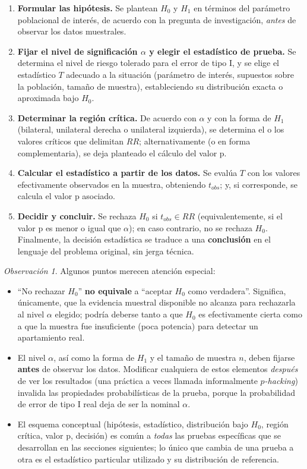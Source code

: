 \documentclass[11pt,a4paper]{article}
\theoremstyle{plain}
\theoremstyle{definition}
\theoremstyle{remark}
\newtheorem{observacion}[teorema]{Observación}
\begin{document}
\begin{enumerate}[label=\textbf{Paso \arabic*.}, wide]
\item \textbf{Formular las hipótesis.} Se plantean $H_0$ y $H_1$ en términos del parámetro poblacional de interés, de acuerdo con la pregunta de investigación, \emph{antes} de observar los datos muestrales.
\item \textbf{Fijar el nivel de significación $\alpha$ y elegir el estadístico de prueba.} Se determina el nivel de riesgo tolerado para el error de tipo I, y se elige el estadístico $T$ adecuado a la situación (parámetro de interés, supuestos sobre la población, tamaño de muestra), estableciendo su distribución exacta o aproximada bajo $H_0$.
\item \textbf{Determinar la región crítica.} De acuerdo con $\alpha$ y con la forma de $H_1$ (bilateral, unilateral derecha o unilateral izquierda), se determina el o los valores críticos que delimitan $RR$; alternativamente (o en forma complementaria), se deja planteado el cálculo del valor p.
\item \textbf{Calcular el estadístico a partir de los datos.} Se evalúa $T$ con los valores efectivamente observados en la muestra, obteniendo $t_{obs}$; y, si corresponde, se calcula el valor p asociado.
\item \textbf{Decidir y concluir.} Se rechaza $H_0$ si $t_{obs}\in RR$ (equivalentemente, si el valor p es menor o igual que $\alpha$); en caso contrario, no se rechaza $H_0$. Finalmente, la decisión estadística se traduce a una \textbf{conclusión} en el lenguaje del problema original, sin jerga técnica.
\end{enumerate}

\begin{observacion}
Algunos puntos merecen atención especial:
\begin{itemize}[nosep]
\item ``No rechazar $H_0$'' \textbf{no equivale} a ``aceptar $H_0$ como verdadera''. Significa, únicamente, que la evidencia muestral disponible no alcanza para rechazarla al nivel $\alpha$ elegido; podría deberse tanto a que $H_0$ es efectivamente cierta como a que la muestra fue insuficiente (poca potencia) para detectar un apartamiento real.
\item El nivel $\alpha$, así como la forma de $H_1$ y el tamaño de muestra $n$, deben fijarse \textbf{antes} de observar los datos. Modificar cualquiera de estos elementos \emph{después} de ver los resultados (una práctica a veces llamada informalmente \emph{$p$-hacking}) invalida las propiedades probabilísticas de la prueba, porque la probabilidad de error de tipo I real deja de ser la nominal $\alpha$.
\item El esquema conceptual (hipótesis, estadístico, distribución bajo $H_0$, región crítica, valor p, decisión) es común a \emph{todas} las pruebas específicas que se desarrollan en las secciones siguientes; lo único que cambia de una prueba a otra es el estadístico particular utilizado y su distribución de referencia.
\end{itemize}
\end{observacion}
\end{document}
